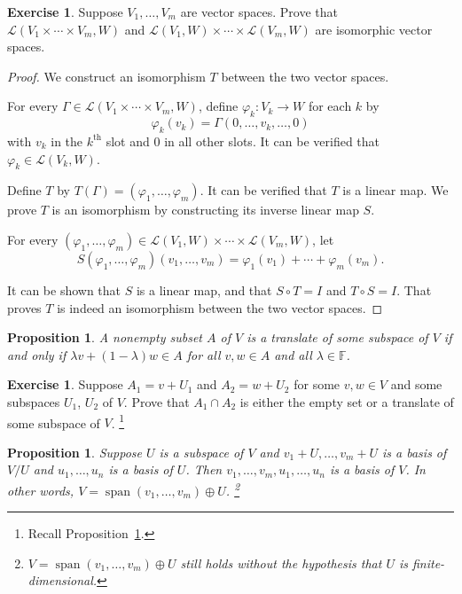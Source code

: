 \documentclass[colorlinks]{tufte-handout}
\theoremstyle{plain} %
\newtheorem{prop}[thm]{Proposition}
\theoremstyle{definition}
\newtheorem{exer}[thm]{Exercise}
\theoremstyle{remark}
\newcommand{\bra}[1]{\mathopen{}\left(#1\right)}
\renewcommand{\phi}{\varphi}
\newcommand{\F}{\mathbb{F}}
\renewcommand{\L}{\mathcal{L}}
\DeclareMathOperator{\spn}{span}
\begin{document}
\begin{exer}
	Suppose $V_1,\dots,V_m$ are vector spaces. Prove that $\L\bra{V_1\times\cdots\times V_m,W}$ and $\L\bra{V_1,W}\times\cdots\times\L\bra{V_m,W}$ are isomorphic vector spaces. 
\end{exer}
\begin{proof}
	We construct an isomorphism $T$ between the two vector spaces.
	
	For every $\Gamma\in\L\bra{V_1\times\cdots\times V_m,W}$, define $\phi_k:V_k\to W$ for each $k$ by
	\[\phi_k\bra{v_k}=\Gamma\bra{0,\dots,v_k,\dots,0}\]
	with $v_k$ in the $k^\text{th}$ slot and $0$ in all other slots. It can be verified that $\phi_k\in\L\bra{V_k,W}$.

	Define $T$ by $T\bra{\Gamma}=\bra{\phi_1,\dots,\phi_m}$. It can be verified that $T$ is a linear map. We prove $T$ is an isomorphism by constructing its inverse linear map $S$.

	For every $\bra{\phi_1,\dots,\phi_m}\in\L\bra{V_1,W}\times\cdots\times\L\bra{V_m,W}$, let
	\[S\bra{\phi_1,\dots,\phi_m}\bra{v_1,\dots,v_m}=\phi_1\bra{v_1}+\cdots+\phi_m\bra{v_m}.\]
	
	It can be shown that $S$ is a linear map, and that $S\circ T=I$ and $T\circ S=I$. That proves $T$ is indeed an isomorphism between the two vector spaces.
\end{proof}

\begin{prop}\label{prop: test for translate}
	A nonempty subset $A$ of $V$ is a translate of some subspace of $V$ if and only if $\lambda v+\bra{1-\lambda}w\in A$ for all $v,w\in A$ and all $\lambda\in\F$.
\end{prop}

\begin{exer}
	Suppose $A_1=v+U_1$ and $A_2=w+U_2$ for some $v,w\in V$ and some subspaces $U_1$, $U_2$ of $V$. Prove that $A_1\cap A_2$ is either the empty set or a translate of some subspace of $V$.%
    \footnote{Recall Proposition~\ref{prop: test for translate}.}
\end{exer}

\begin{prop}\label{prop: direct sum from quotient space}
	Suppose $U$ is a subspace of $V$ and $v_1+U,\dots,v_m+U$ is a basis of $V/U$ and $u_1,\dots,u_n$ is a basis of $U$. Then $v_1,\dots,v_m,u_1,\dots,u_n$ is a basis of $V$. In other words, $V=\spn(v_1,\dots,v_m)\oplus U$.%
    \footnote{$V=\spn(v_1,\dots,v_m)\oplus U$ still holds without the hypothesis that $U$ is finite-dimensional.}
\end{prop}
\end{document}
